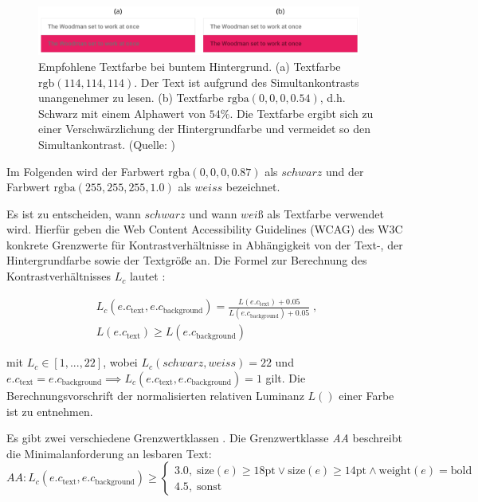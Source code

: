\begin{figure}[h]
	\centering
	\includegraphics[width=0.95\textwidth]{img/text_color.png}
	\caption{Empfohlene Textfarbe bei buntem Hintergrund. (a) Textfarbe $\text{rgb}(114,114,114)$. Der Text ist aufgrund des Simultankontrasts unangenehmer zu lesen. (b) Textfarbe $\text{rgba}(0, 0, 0, 0.54)$, d.h. Schwarz mit einem Alphawert  von $54\%$. Die Textfarbe ergibt sich zu einer Verschwärzlichung der Hintergrundfarbe und vermeidet so den Simultankontrast. (Quelle: \citep{google})}
	\label{fig:text_color}
\end{figure}
Im Folgenden wird der Farbwert $\text{rgba}(0, 0, 0, 0.87)$ als $schwarz$ und der Farbwert $\text{rgba}(255, 255, 255, 1.0)$ als $weiss$ bezeichnet.

Es ist zu entscheiden,  wann $schwarz$ und wann $weiß$ als Textfarbe verwendet wird. Hierfür geben die Web Content Accessibility Guidelines (WCAG) des W3C konkrete Grenzwerte für Kontrastverhältnisse in Abhängigkeit von der Text-, der Hintergrundfarbe sowie der Textgröße an. Die Formel zur Berechnung des Kontrastverhältnisses $L_c$ lautet \citep{wcag-contrast}:

\begin{equation}
	\begin{split}
		L_c(e.c_\text{text}, e.c_\text{background}) = \frac{L(e.c_\text{text}) + 0.05}{L(e.c_\text{background}) + 0.05} \;,\\
		L(e.c_\text{text}) \geq L(e.c_\text{background})
	\end{split}
\end{equation}

mit $L_c \in [1, ... , 22]$, wobei $L_c(schwarz, weiss) = 22$ und $e.c_\text{text} = e.c_\text{background} \implies L_c(e.c_\text{text}, e.c_\text{background}) = 1$ gilt. Die Berechnungsvorschrift der normalisierten relativen Luminanz $L()$ einer Farbe ist \citep{wcag-rel-luminance} zu entnehmen.

Es gibt zwei verschiedene Grenzwertklassen \citep{wcag}. Die Grenzwertklasse \emph{AA} beschreibt die Minimalanforderung an lesbaren Text:
\begin{equation}
  	AA: L_c(e.c_\text{text}, e.c_\text{background}) \geq
	\begin{cases}
	3.0, \; \text{size}(e) \geq 18\text{pt} \lor \text{size}(e) \geq 14\text{pt} \land \text{weight}(e) = \text{bold}\\
		4.5,  \;  \text{sonst}
	\end{cases}
\end{equation}

